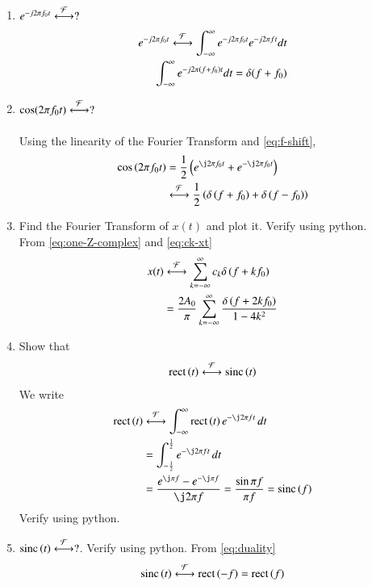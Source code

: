 \documentclass[journal,12pt,twocolumn]{IEEEtran}
\renewcommand\thesection{\arabic{section}}
\begin{document}
\begin{enumerate}[label=\thesection.\arabic*
,ref=\thesection.\theenumi]
\begin{align}
	= e^{\j 2\pi (0) t} = 1
	\label{eq:fourier-delta}
\end{align}
\item $e^{-j2\pi f_0t}\overset{\mathcal{F}}{ \longleftrightarrow}?$\\
\solution %
\begin{align}
	e^{-j2\pi f_0t}\overset{\mathcal{F}}{ \longleftrightarrow} \int_{-\infty}^{\infty} e^{-j2\pi f_0t} e^{-j2\pi ft}dt\\
	\int_{-\infty}^{\infty} e^{-j2\pi (f+f_0)t} dt
	=\delta(f+f_0)
	\label{eq:f-shift}
\end{align}
\item $\cos(2\pi f_0t)\overset{\mathcal{F}}{ \longleftrightarrow}?$\\
\solution\\
Using the linearity of the Fourier Transform and \eqref{eq:f-shift},
\begin{align}
	\cos\brak{2\pi f_0t} &= \frac{1}{2}
	\brak{e^{\j2\pi f_0t} + e^{-\j2\pi f_0t}} \nonumber \\ 
	&\system{F}\frac{1}{2}\brak{\delta\brak{f+f_0} + \delta\brak{f-f_0}}
\end{align}
 \item Find the Fourier Transform of $x(t)$ and plot it.  Verify using python.\\
 \solution From \eqref{eq:one-Z-complex} and \eqref{eq:ck-xt}
\begin{align}
 x(t)&\overset{\mathcal{F}}{ \longleftrightarrow}\sum_{k=-\infty}^{\infty}c_k\delta\left(f+kf_0\right) \\
 &=\frac{2A_0}{\pi}\sum_{k=-\infty}^{\infty}\frac{\delta\left(f+2kf_0\right)}{1-4k^2}
 \label{eq:fourier-xt}
\end{align}
 \item Show that 
 \begin{align}
	 \text{rect}\left(t\right) \overset{\mathcal{F}}{ \longleftrightarrow} \text{sinc}\left(t\right)
 \end{align}
\solution We write
\begin{align}
	\rect{t}&\system{F}\int_{-\infty}^{\infty}\rect{t}e^{-\j2\pi ft}\, dt \\
	&=\int_{-\frac{1}{2}}^{\frac{1}{2}}e^{-\j2\pi ft}\, dt \\
	&=\frac{e^{\j\pi f} - e^{-\j\pi f}}{\j2\pi f} = \frac{\sin{\pi f}}{\pi f} = \sinc{f}
	\label{eq:fourier-rect}
\end{align}		
 Verify using python.
 \item 
$	 \text{sinc}\left(t\right)\overset{\mathcal{F}}{ \longleftrightarrow} ?$.  Verify using python.
\solution From \eqref{eq:duality}
\begin{align}
	\text{sinc}\left(t\right)\overset{\mathcal{F}}{ \longleftrightarrow}\text{rect}\left(-f\right)=\text{rect}\left(f\right)
	\label{eq:fourier-sinc}
\end{align}
\end{enumerate}
\end{document}
